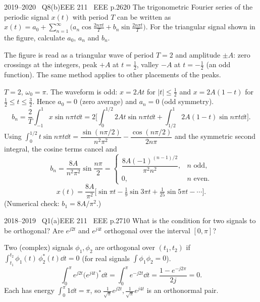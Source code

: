 \begin{qcard}{2019--2020 \textbullet\ Q8(b)}{EEE 211 \textbullet\ EEE p.26}{20}
The trigonometric Fourier series of the periodic signal $x(t)$ with period $T$ can be written as $x(t)=a_0+\sum_{n=1}^\infty\big(a_n\cos\frac{2n\pi t}{T}+b_n\sin\frac{2n\pi t}{T}\big)$. For the triangular signal shown in the figure, calculate $a_0$, $a_n$ and $b_n$.
\end{qcard}
\begin{notebox}The figure is read as a triangular wave of period $T=2$ and amplitude $\pm A$: zero crossings at the integers, peak $+A$ at $t=\frac12$, valley $-A$ at $t=-\frac12$ (an odd function). The same method applies to other placements of the peaks.\end{notebox}
\begin{solution}
$T=2$, $\omega_0=\pi$. The waveform is odd: $x=2At$ for $|t|\le\frac12$ and $x=2A(1-t)$ for $\frac12\le t\le\frac32$. Hence $a_0=0$ (zero average) and $a_n=0$ (odd symmetry).
\[
b_n=\frac2T\int_{-1}^{1}x\sin n\pi t\dd t=2\Big[\int_0^{1/2}2At\sin n\pi t\dd t+\int_{1/2}^{1}2A(1-t)\sin n\pi t\dd t\Big].
\]
Using $\int_0^{1/2}t\sin n\pi t\dd t=\dfrac{\sin(n\pi/2)}{n^2\pi^2}-\dfrac{\cos(n\pi/2)}{2n\pi}$ and the symmetric second integral, the cosine terms cancel and
\[
b_n=\frac{8A}{n^2\pi^2}\sin\frac{n\pi}{2}=\begin{cases}\dfrac{8A(-1)^{(n-1)/2}}{\pi^2n^2},&n\text{ odd},\\0,&n\text{ even}.\end{cases}
\]
\[x(t)=\frac{8A}{\pi^2}\Big[\sin\pi t-\tfrac19\sin3\pi t+\tfrac1{25}\sin5\pi t-\cdots\Big].\]
(Numerical check: $b_1=8A/\pi^2$.)
\end{solution}

\begin{qcard}{2018--2019 \textbullet\ Q1(a)}{EEE 211 \textbullet\ EEE p.27}{10}
What is the condition for two signals to be orthogonal? Are $e^{j2t}$ and $e^{j4t}$ orthogonal over the interval $[0,\pi]$?
\end{qcard}
\begin{solution}
Two (complex) signals $\phi_1,\phi_2$ are orthogonal over $(t_1,t_2)$ if $\displaystyle\int_{t_1}^{t_2}\phi_1(t)\,\phi_2^*(t)\dd t=0$ (for real signals $\int\phi_1\phi_2=0$).
\[
\int_0^\pi e^{j2t}\big(e^{j4t}\big)^*\dd t=\int_0^\pi e^{-j2t}\dd t=\frac{1-e^{-j2\pi}}{2j}=0 .
\]
Each has energy $\int_0^\pi1\dd t=\pi$, so $\frac1{\sqrt\pi}e^{j2t},\frac1{\sqrt\pi}e^{j4t}$ is an orthonormal pair.
\end{solution}

